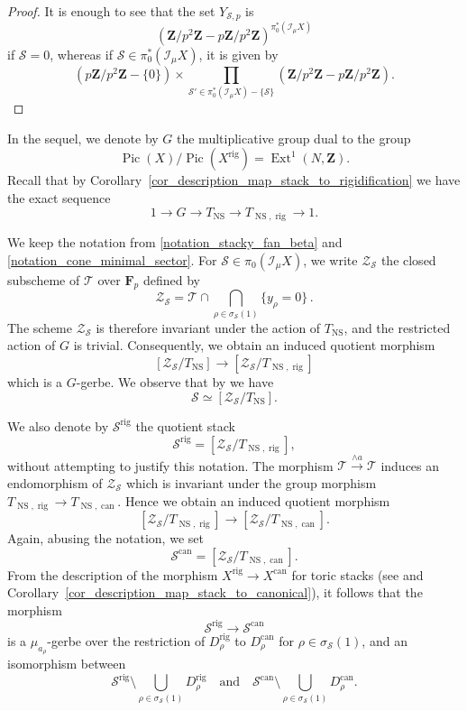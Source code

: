 \documentclass{proc-l}
\newcommand{\Z}{\mathbf{Z}}
\newcommand{\F}{\mathbf{F}}
\DeclareMathOperator{\Pic}{Pic}
\DeclareMathOperator{\can}{can}
\DeclareMathOperator{\Ext}{Ext}
\DeclareMathOperator{\NS}{NS}
\DeclareMathOperator{\rig}{rig}
\newcommand{\stackZ}{\mathcal{Z}}
\newcommand{\stackS}{\mathcal{S}}
\newcommand{\stackT}{\mathcal{T}}
\newcommand{\sheafI}{\mathcal{I}}
\newcommand{\sector}{\pi_0(\sheafI_{\mu} X)}
\newcommand{\twistsector}{\pi_0^*(\sheafI_{\mu} X)}
\theoremstyle{definition}
\theoremstyle{remark}
\numberwithin{equation}{section}
\begin{document}
\begin{proof}
It is enough to see that the set $Y_{\stackS,p}$ is
\[
\left(\Z/p^2\Z - p\Z/p^2\Z\right)^{\twistsector}
\]
if $\stackS = 0$, whereas if $\stackS \in \twistsector$, it is given by
\[
\left(p\Z/p^2\Z - \{0\}\right)
\times
\prod_{\stackS' \in \twistsector - \{\stackS\}}
\left(\Z/p^2\Z - p\Z/p^2\Z\right).
\]
\end{proof}

In the sequel, we denote by $G$ the multiplicative group dual to the group
$$\Pic(X)/\Pic(X^{\rig}) = \Ext^1(N,\Z).$$Recall that by Corollary~\ref{cor_description_map_stack_to_rigidification} we have the exact sequence
\[
1 \rightarrow G \rightarrow T_{\NS} \rightarrow T_{\NS,\rig} \rightarrow 1 .
\]

We keep the notation from \ref{notation_stacky_fan_beta} and \ref{notation_cone_minimal_sector}. For $\stackS \in \sector$, we write $\stackZ_{\stackS}$ the closed subscheme of $\stackT$ over $\F_p$ defined by
\[
\stackZ_{\stackS}
=
\stackT \cap
\bigcap_{\rho \in \sigma_\stackS(1)}
\{y_{\rho}=0\} \, .
\]The scheme $\stackZ_{\stackS}$ is therefore invariant under the action of $T_{\NS}$, and the restricted action of $G$ is trivial. Consequently, we obtain an induced quotient morphism
\[
[\stackZ_{\stackS}/T_{\NS}]
\longrightarrow
[\stackZ_{\stackS}/T_{\NS,\rig}]
\]
which is a $G$-gerbe. We observe that by \cite[Lemma~4.6, Proposition~4.7]{borisov_toric_stack} we have
\[
\stackS \simeq [\stackZ_{\stackS}/T_{\NS}] .
\]

We also denote by $\stackS^{\rig}$ the quotient stack
\[
\stackS^{\rig} = [\stackZ_{\stackS}/T_{\NS,\rig}],
\]
without attempting to justify this notation. The morphism $\stackT \xrightarrow{\wedge a} \stackT$ induces an endomorphism of
$\stackZ_{\stackS}$ which is invariant under the group morphism
$T_{\NS,\rig} \to T_{\NS,\can}$. Hence we obtain an induced quotient morphism
\[
[\stackZ_{\stackS}/T_{\NS,\rig}]
\longrightarrow
[\stackZ_{\stackS}/T_{\NS,\can}] .
\]Again, abusing the notation, we set
\[
\stackS^{\can} = [\stackZ_{\stackS}/T_{\NS,\can}] .
\]From the description of the morphism $X^{\rig} \to X^{\can}$ for toric stacks
(see \cite[Theorem~5.2~(2)]{fantechi_toric_stack} and
Corollary~\ref{cor_description_map_stack_to_canonical}), it follows that the
morphism
\[
\stackS^{\rig} \longrightarrow \stackS^{\can}
\]
is a $\mu_{a_{\rho}}$-gerbe over the restriction of $D_{\rho}^{\rig}$ to
$D_{\rho}^{\can}$ for $\rho \in \sigma_\stackS(1)$, and an isomorphism between
\[
\stackS^{\rig} \setminus \bigcup_{\rho \in \sigma_\stackS(1)} D_{\rho}^{\rig}
\quad\text{and}\quad
\stackS^{\can} \setminus \bigcup_{\rho \in \sigma_\stackS(1)} D_{\rho}^{\can}.
\]
\end{document}
